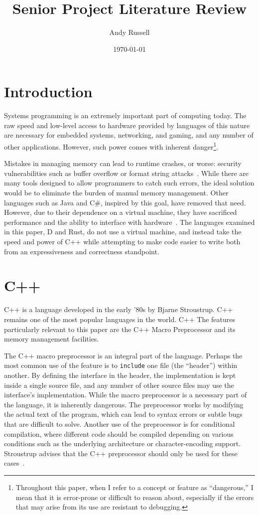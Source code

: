 \documentclass[finalcopy,short]{srpaper}
\title{Senior Project Literature Review}
\author{Andy Russell}
\date{\today}
\begin{document}
\frontmatter

\section{Introduction}

Systems programming is an extremely important part of computing today. The raw
speed and low-level access to hardware provided by languages of this nature are
necessary for embedded systems, networking, and gaming, and any number of other
applications. However, such power comes with inherent
danger\footnote{Throughout this paper, when I refer to a concept or feature as
    ``dangerous,'' I mean that it is error-prone or difficult to reason about,
    especially if the errors that may arise from its use are resistant to
    debugging.}.

Mistakes in managing memory can lead to runtime crashes, or worse: security
vulnerabilities such as buffer overflow or format string
attacks~\cite{Shahriar:2012:MPS:2187671.2187673}. While there are many tools
designed to allow programmers to catch such errors, the ideal solution would be
to eliminate the burden of manual memory management. Other languages such as
Java and C\#, inspired by this goal, have removed that need. However, due to
their dependence on a virtual machine, they have sacrificed performance and the
ability to interface with hardware~\cite{Alexandrescu:2010:DPL:1875434}. The
languages examined in this paper, D and Rust, do not use a virtual machine, and
instead take the speed and power of C++ while attempting to make code easier to
write both from an expressiveness and correctness standpoint.

\section{C++}

C++ is a language developed in the early '80s by Bjarne Stroustrup. C++
remains one of the most popular languages in the world. C++ The features
particularly relevant to this paper are the C++ Macro Preprocessor and its
memory management facilities.

The C++ macro preprocessor is an integral part of the language. Perhaps the
most common use of the feature is to \texttt{include} one file (the ``header'')
within another. By defining the interface in the header, the implementation is
kept inside a single source file, and any number of other source files may use
the interface's implementation. While the macro preprocessor is a necessary
part of the language, it is inherently dangerous. The preprocessor works by
modifying the actual text of the program, which can lead to syntax errors or
subtle bugs that are difficult to solve. Another use of the preprocessor is
for conditional compilation, where different code should be compiled depending
on various conditions such as the underlying architecture or character-encoding
support. Stroustrup advises that the C++ preprocessor should only be used for
these cases~\cite{stroustrup2013the}.
\end{document}
